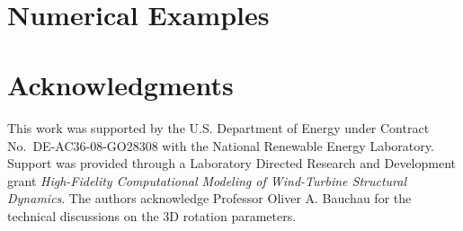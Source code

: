 \documentclass{aiaa-tc}
\begin{document}

~
\vspace{0.1in}
~




%

\section{Numerical Examples}










\section*{Acknowledgments} 

This work was supported by the U.S. Department of Energy under Contract No.\
DE-AC36-08-GO28308 with the National Renewable Energy Laboratory. Support
was provided through a Laboratory Directed Research and Development grant
\textit{High-Fidelity Computational Modeling of Wind-Turbine Structural
Dynamics}.  The authors acknowledge Professor Oliver A.  Bauchau for the technical
discussions on the 3D rotation parameters.
 



\end{document}
